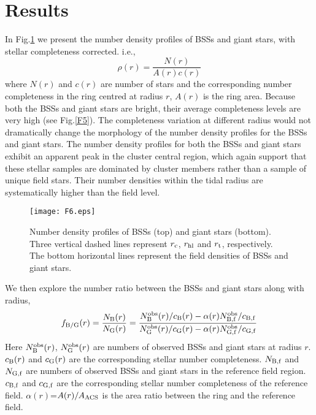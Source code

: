 \documentclass[useAMS,usenatbib,twocolumn]{mnras}
\begin{document}
\section{Results}\label{S3}
In Fig.\ref{F6} we present the number density profiles of BSSs and giant stars, with stellar completeness corrected. i.e., 
\begin{equation}
\rho(r)=\frac{N(r)}{A(r)c(r)}
\end{equation}
where $N(r)$ and $c(r)$ are number of stars and the corresponding number completeness in the ring centred at radius $r$, $A(r)$ is the ring area. Because both the BSSs and giant stars are bright, their average completeness levels are very high (see Fig.\ref{F5}). The completeness variation at different radius would not dramatically change the morphology of the number density profiles for the BSSs and giant stars. The number density profiles for both the BSSs and giant stars exhibit an apparent peak in the cluster central region, which again support that these stellar samples are dominated by cluster members rather than a sample of unique field stars. Their number densities within the tidal radius are systematically higher than the field level. 

\begin{figure}
  \centering
  \texttt{[image: F6.eps]}
  \caption{Number density profiles of BSSs (top) and giant stars (bottom). Three vertical dashed lines represent $r_{\rm c}$, $r_{\rm hl}$ and $r_{\rm t}$, respectively. The bottom horizontal lines represent the field densities of BSSs and giant stars.}\label{F6}
\end{figure}

We then explore the number ratio between the BSSs and giant stars along with radius,
\begin{equation}
f_{\rm B/G}(r)=\frac{N_{\rm B}(r)}{N_{\rm G}(r)}=\frac{N_{\rm B}^{\rm obs}(r)/c_{\rm B}(r)-\alpha(r)N_{\rm B,f}^{\rm obs}/c_{\rm B,f}}{N_{\rm G}^{\rm obs}(r)/c_{\rm G}(r)-\alpha(r)N_{\rm G,f}^{\rm obs}/c_{\rm G,f}}
\end{equation}
Here $N_{\rm B}^{\rm obs}(r)$, $N_{\rm G}^{\rm obs}(r)$ are numbers of observed BSSs and giant stars at radius $r$. $c_{\rm B}(r)$ and $c_{\rm G}(r)$ are the corresponding stellar number completeness. $N_{\rm B,f}$ and $N_{\rm G,f}$ are numbers of observed BSSs and giant stars in the reference field region. $c_{\rm B,f}$ and $c_{\rm G,f}$ are the corresponding stellar number completeness of the reference field. $\alpha(r)$=$A(r)/A_{\rm ACS}$ is the area ratio between the ring and the reference field. 
\end{document}
